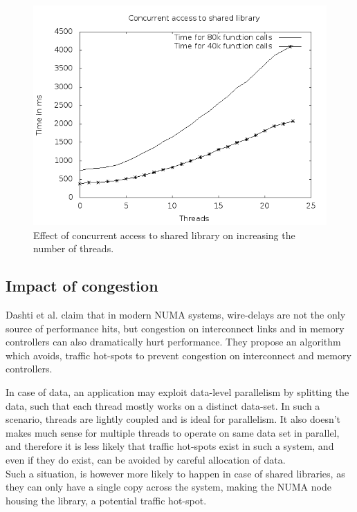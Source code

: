 \begin{figure}
    \centering
    \includegraphics[scale=0.39]{timevsthread_noMem.png}
    \caption{Effect of concurrent access to shared library on increasing the number of threads.}
    \label{fig:timevsthread.png}
\end{figure}

\subsection{Impact of congestion}
Dashti et al. \cite{Dashti:2013:TMH:2490301.2451157} claim that in modern NUMA systems, wire-delays
are not the only source of performance hits, but congestion on interconnect links and in memory 
controllers can also dramatically hurt performance. They propose an algorithm which avoids, traffic
hot-spots to prevent congestion on interconnect and memory controllers.

In case of data, an application may exploit data-level parallelism by splitting the data, such that
each thread mostly works on a distinct data-set. In such a scenario, threads are lightly coupled and
is ideal for parallelism. It also doesn't makes much sense for multiple threads to operate on 
same data set in parallel, and therefore it is less likely that traffic hot-spots exist in such a system,
and even if they do exist, can be avoided by careful allocation of data.\\
Such a situation, is however more likely to happen in case of shared libraries, as they can only have
a single copy across the system, making the NUMA node housing the library, a potential traffic hot-spot.

